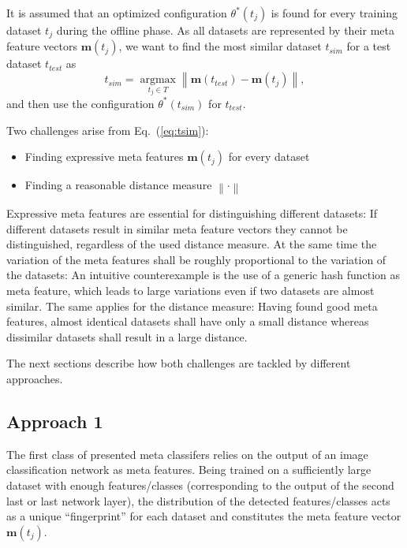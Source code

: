 \documentclass{article}
\begin{document}
It is assumed that an optimized configuration $\theta^*(t_j)$ is found for every training dataset $t_j$ during the offline phase. As all datasets are represented by their meta feature vectors $\mathbf{m}(t_j)$, we want to find the most similar dataset $t_{sim}$ for a test dataset $t_{test}$ as 
%
\begin{equation}
t_{sim} = \underset{t_j \in T}{\operatorname{argmax}}  \left\|\mathbf{m}(t_{test}) - \mathbf{m}(t_j)\right\|, 
\label{eq:tsim}
\end{equation}
%
and then use the configuration $\theta^*(t_{sim})$ for $t_{test}$. 

Two challenges arise from Eq.~(\ref{eq:tsim}):
%
\begin{itemize}
\item Finding expressive meta features $\mathbf{m}(t_j)$ for every dataset
\item Finding a reasonable distance measure $\left\| \cdot \right\|$ 
\end{itemize} 
%
Expressive meta features are essential for distinguishing different datasets: If different datasets result in similar meta feature vectors they cannot be distinguished, regardless of the used distance measure. At the same time the variation of the meta features shall be roughly proportional to the variation of the datasets: An intuitive counterexample is the use of a generic hash function as meta feature, which leads to large variations even if two datasets are almost similar. The same applies for the distance measure: Having found good meta features, almost identical datasets shall have only a small distance whereas dissimilar datasets shall result in a large distance. 

The next sections describe how both challenges are tackled by different approaches.

\subsection{Approach 1}
\label{sec:approach1}

The first class of presented meta classifers relies on the output of an image classification network as meta features. Being trained on a sufficiently large dataset with enough features/classes (corresponding to the output of the second last or last network layer), the distribution of the detected features/classes acts as a unique ``fingerprint'' for each dataset and constitutes the meta feature vector $\mathbf{m}(t_j)$. 
\end{document}
